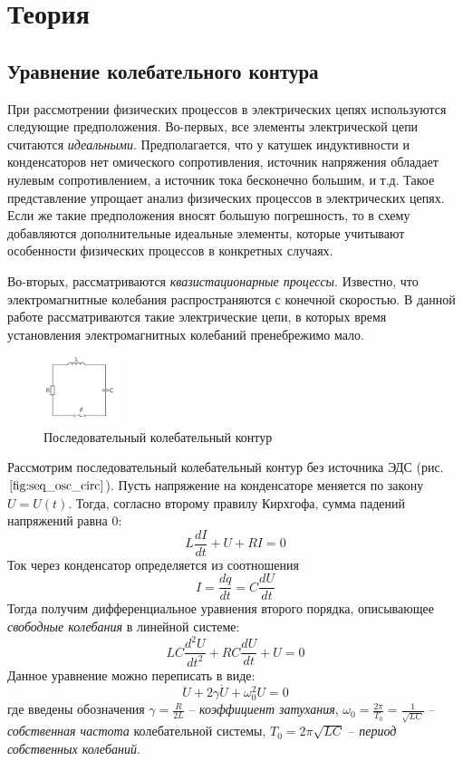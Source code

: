 \section*{Теория}

\subsection*{Уравнение колебательного контура}

При рассмотрении физических процессов в электрических цепях используются следующие предположения. Во-первых, все элементы электрической цепи считаются \textit{идеальными}. Предполагается, что у катушек индуктивности и конденсаторов нет омического сопротивления, источник напряжения обладает нулевым сопротивлением, а источник тока бесконечно большим, и т.д. Такое представление упрощает анализ физических процессов в электрических цепях. Если же такие предположения вносят большую погрешность, то в схему добавляются дополнительные идеальные элементы, которые учитывают особенности физических процессов в конкретных случаях. 

Во-вторых, рассматриваются \textit{квазистационарные процессы}. Известно, что электромагнитные колебания распространяются с конечной скоростью. В данной работе рассматриваются такие электрические цепи, в которых время установления электромагнитных колебаний пренебрежимо мало. 

\begin{figure}
	\vspace{-10pt}
	\centering
	\includegraphics[width=0.2\textwidth]{../res/seq_osc_circ.png}
	\caption{Последовательный колебательный контур}
	\label{fig:seq_osc_circ}
\end{figure}

Рассмотрим последовательный колебательный контур без источника ЭДС (рис. $\ref{fig:seq_osc_circ}$).  Пусть напряжение на конденсаторе меняется по закону $U = U(t)$. Тогда, согласно второму правилу Кирхгофа, сумма падений напряжений равна 0:
$$
L \frac{dI}{dt} + U + RI = 0
$$
Ток через конденсатор определяется из соотношения
$$
I = \frac{dq}{dt} = C\frac{dU}{dt}
$$
Тогда получим дифференциальное уравнения второго порядка, описывающее \textit{свободные колебания} в линейной системе:
$$
LC \frac{d^2 U}{dt^2} + RC \frac{dU}{dt} + U = 0
$$
Данное уравнение можно переписать в виде:
\begin{equation*}
	\ddot{U} + 2\gamma \dot{U} + \omega_0^2 U = 0
	\label{eq:diff_eq}
\end{equation*}
где введены обозначения $\gamma = \frac{R}{2L}$ -- \textit{коэффициент затухания}, $\omega_0 = \frac{2\pi}{T_0} = \frac{1}{\sqrt{LC}}$ -- \textit{собственная частота} колебательной системы, $T_0 = 2\pi \sqrt{LC}$ -- \textit{период собственных колебаний}.

